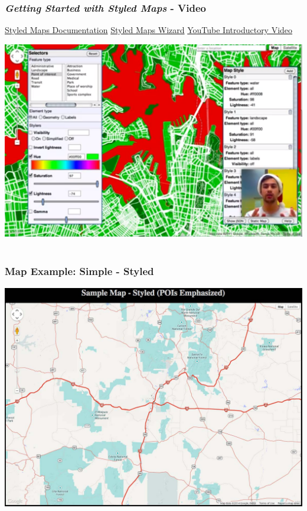 \documentclass[]{article}
\begin{document}
\subsubsection{\emph{Getting Started with Styled Maps} -
Video}\label{getting-started-with-styled-maps---video}

\href{https://developers.google.com/maps/documentation/javascript/styling}{Styled
Maps Documentation} \textbar{}
\href{http://gmaps-samples-v3.googlecode.com/svn/trunk/styledmaps/wizard/index.html}{Styled
Maps Wizard} \textbar{} \href{http://youtu.be/0hhiEjf7_NA}{YouTube
Introductory Video}

\includegraphics{./images/styledMapsWizard.png}~

\subsubsection{Map Example: Simple -
Styled}\label{map-example-simple---styled}

\includegraphics{images/google_11.jpg}~
\end{document}
